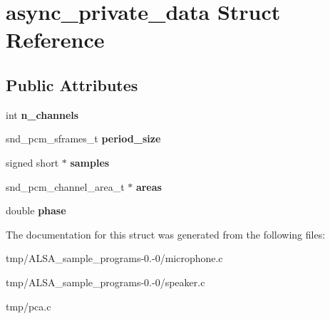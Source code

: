 \hypertarget{structasync__private__data}{\section{async\-\_\-private\-\_\-data \-Struct \-Reference}
\label{structasync__private__data}
}
\subsection*{\-Public \-Attributes}
\begin{DoxyCompactItemize}
\item 
\hypertarget{structasync__private__data_aeff93efe2bf508172fd38ec5aa7a166f}{int {\bfseries n\-\_\-channels}}\label{structasync__private__data_aeff93efe2bf508172fd38ec5aa7a166f}

\item 
\hypertarget{structasync__private__data_a6f6047dfdb133942b529894e34dad934}{snd\-\_\-pcm\-\_\-sframes\-\_\-t {\bfseries period\-\_\-size}}\label{structasync__private__data_a6f6047dfdb133942b529894e34dad934}

\item 
\hypertarget{structasync__private__data_a4f8cbbb6d282c10937c13bd79b9476a7}{signed short $\ast$ {\bfseries samples}}\label{structasync__private__data_a4f8cbbb6d282c10937c13bd79b9476a7}

\item 
\hypertarget{structasync__private__data_a869321b8989d997d6cd073fb12bf0cad}{snd\-\_\-pcm\-\_\-channel\-\_\-area\-\_\-t $\ast$ {\bfseries areas}}\label{structasync__private__data_a869321b8989d997d6cd073fb12bf0cad}

\item 
\hypertarget{structasync__private__data_a45fdf8885d31e19f456992da375231eb}{double {\bfseries phase}}\label{structasync__private__data_a45fdf8885d31e19f456992da375231eb}

\end{DoxyCompactItemize}


\-The documentation for this struct was generated from the following files\-:\begin{DoxyCompactItemize}
\item 
tmp/\-A\-L\-S\-A\-\_\-sample\-\_\-programs-\/0.-\/0/microphone.\-c\item 
tmp/\-A\-L\-S\-A\-\_\-sample\-\_\-programs-\/0.-\/0/speaker.\-c\item 
tmp/pca.\-c\end{DoxyCompactItemize}
